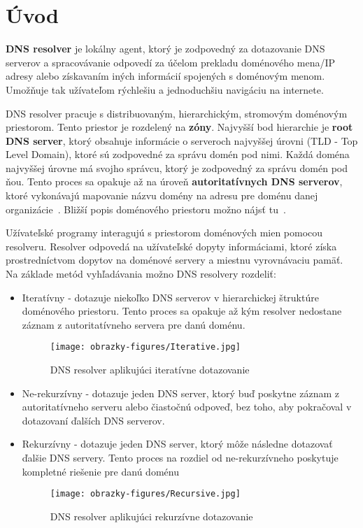 
\chapter{Úvod}
\textbf{DNS resolver} je lokálny agent, ktorý je zodpovedný za dotazovanie DNS serverov a spracovávanie odpovedí za účelom prekladu doménového mena/IP adresy alebo získavaním iných informácií spojených s doménovým menom. Umožňuje tak užívateľom rýchlešiu a jednoduchšiu navigáciu na internete.~\cite{RFC1035}

DNS resolver pracuje s distribuovaným, hierarchickým, stromovým doménovým priestorom. Tento priestor je rozdelený na \textbf{zóny}. Najvyšší bod hierarchie je \textbf{root DNS server}, ktorý obsahuje informácie o serveroch najvyššej úrovni (TLD - Top Level Domain), ktoré sú zodpovedné za správu domén pod nimi. Každá doména najvyššej úrovne má svojho správcu, ktorý je zodpovedný za správu domén pod ňou. Tento proces sa opakuje až na úroveň \textbf{autoritatívnych DNS serverov}, ktoré vykonávajú mapovanie názvu domény na adresu pre doménu danej organizácie~\cite{enwiki:1182387275}. Bližší popis doménového priestoru možno nájsť tu~\cite{RFC1034}.

Užívateľské programy interagujú s priestorom doménových mien pomocou resolveru. Resolver odpovedá na užívateľské dopyty informáciami, ktoré získa prostredníctvom dopytov na doménové servery a miestnu vyrovnávaciu pamäť. Na základe metód vyhľadávania možno DNS resolvery rozdeliť:
\begin{itemize}
    \item Iteratívny - dotazuje niekoľko DNS serverov v hierarchickej štruktúre doménového priestoru. Tento proces sa opakuje až kým resolver nedostane záznam z autoritatívneho servera pre danú doménu.
    \begin{figure}[!ht]
        \centering     %
        \texttt{[image: obrazky-figures/Iterative.jpg]}
        \caption{DNS resolver aplikujúci iteratívne dotazovanie}
        \label{fig:iterative-DNS-resolver}
    \end{figure}
    
    \item Ne-rekurzívny - dotazuje jeden DNS server, ktorý buď poskytne záznam z autoritatívneho serveru alebo čiastočnú odpoveď, bez toho, aby pokračoval v dotazovaní ďalších DNS serverov.
    
    \item Rekurzívny - dotazuje jeden DNS server, ktorý môže následne dotazovať ďalšie DNS servery. Tento proces na rozdiel od ne-rekurzívneho poskytuje kompletné riešenie pre danú doménu
    
    \begin{figure}[!ht]
        \centering     %
        \texttt{[image: obrazky-figures/Recursive.jpg]}
        \caption{DNS resolver aplikujúci rekurzívne dotazovanie}
        \label{fig:recursive-DNS-resolver}
    \end{figure}
\end{itemize}

